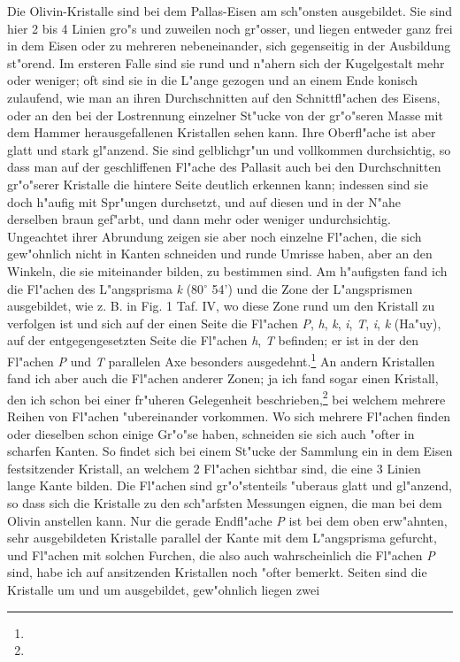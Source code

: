 \documentclass[a4paper, 11pt, oneside]{article}
\begin{document}
Die Olivin-Kristalle sind bei dem Pallas-Eisen am sch"onsten ausgebildet. Sie sind hier 2 bis 4 Linien gro"s und zuweilen noch gr"osser, und liegen entweder ganz frei in dem Eisen oder zu mehreren nebeneinander, sich gegenseitig in der Ausbildung st"orend. Im ersteren Falle sind sie rund und n"ahern sich der Kugelgestalt mehr oder weniger; oft sind sie in die L"ange gezogen und an einem Ende konisch zulaufend, wie man an ihren Durchschnitten auf den Schnittfl"achen des Eisens, oder an den bei der Lostrennung einzelner St"ucke von der gr"o"seren Masse mit dem Hammer herausgefallenen Kristallen sehen kann. Ihre Oberfl"ache ist aber glatt und stark gl"anzend. Sie sind gelblichgr"un und vollkommen durchsichtig, so dass man auf der geschliffenen Fl"ache des Pallasit auch bei den Durchschnitten gr"o"serer Kristalle die hintere Seite deutlich erkennen kann; indessen sind sie doch h"aufig mit Spr"ungen durchsetzt, und auf diesen und in der N"ahe derselben braun gef"arbt, und dann mehr oder weniger undurchsichtig. Ungeachtet ihrer Abrundung zeigen sie aber noch einzelne Fl"achen, die sich gew"ohnlich nicht in Kanten schneiden und runde Umrisse haben, aber an den Winkeln, die sie miteinander bilden, zu bestimmen sind. Am h"aufigsten fand ich die Fl"achen des L"angsprisma \emph{k} (80$^{\circ}$ 54’) und die Zone der L"angsprismen ausgebildet, wie z. B. in Fig. 1 Taf. IV, wo diese Zone rund um den Kristall zu verfolgen ist und sich auf der einen Seite die Fl"achen \emph{P}, \emph{h}, \emph{k}, \emph{i}, \emph{T}, \emph{i}, \emph{k} (Ha"uy), auf der entgegengesetzten Seite die Fl"achen \emph{h}, \emph{T} befinden; er ist in der den Fl"achen \emph{P} und \emph{T} parallelen Axe besonders ausgedehnt.\footnote{} An andern Kristallen fand ich aber auch die Fl"achen anderer Zonen; ja ich fand sogar einen Kristall, den ich schon bei einer fr"uheren Gelegenheit beschrieben,\footnote{} bei welchem mehrere Reihen von Fl"achen "ubereinander vorkommen. Wo sich mehrere Fl"achen finden oder dieselben schon einige Gr"o"se haben, schneiden sie sich auch "ofter in scharfen Kanten. So findet sich bei einem St"ucke der Sammlung ein in dem Eisen festsitzender Kristall, an welchem 2 Fl"achen sichtbar sind, die eine 3 Linien lange Kante bilden. Die Fl"achen sind gr"o"stenteils "uberaus glatt und gl"anzend, so dass sich die Kristalle zu den sch"arfsten Messungen eignen, die man bei dem Olivin anstellen kann. Nur die gerade Endfl"ache \emph{P} ist bei dem oben erw"ahnten, sehr ausgebildeten Kristalle parallel der Kante mit dem L"angsprisma gefurcht, und Fl"achen mit solchen Furchen, die also auch wahrscheinlich die Fl"achen \emph{P} sind, habe ich auf ansitzenden Kristallen noch "ofter bemerkt. Seiten sind die Kristalle um und um ausgebildet, gew"ohnlich liegen zwei 
\end{document}
